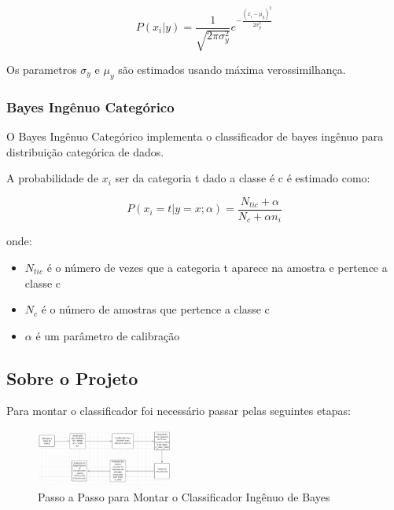 \documentclass[conference]{IEEEtran}
\begin{document}
\begin{equation}
    P(x_i|y) = \frac{1}{\sqrt{2\pi\sigma_y^2}}e^{-\frac{(x_i - \mu_y)^2}{2\sigma_y^2}}
\end{equation}

Os parametros $\sigma_y$ e $\mu_y$ são estimados usando máxima verossimilhança.

\cite{b5}
\subsubsection{Bayes Ingênuo Categórico}
O Bayes Ingênuo Categórico implementa o classificador de bayes ingênuo para distribuição categórica de dados.

A probabilidade de $x_i$ ser da categoria t dado a classe é c é estimado como:

\begin{equation}
    P(x_i = t | y = x; \alpha) = \frac{N_{tic} + \alpha}{N_c + \alpha n_i}
\end{equation}

onde:

\begin{itemize}
\item $N_{tic}$ é o número de vezes que a categoria t aparece na amostra e pertence a classe c
\item $N_c$ é o número de amostras que pertence a classe c
\item $\alpha$ é um parâmetro de calibração
\end{itemize}

\cite{b5}
\subsection{Sobre o Projeto}
Para montar o classificador foi necessário passar  pelas seguintes etapas:

\begin{figure}[H]
    \centerline{\includegraphics[width=0.4\textwidth]{IMGS/block1.png}}
    
    \caption{\label{fig:block1}Passo a Passo para Montar o Classificador Ingênuo de Bayes}
\end{figure}
\end{document}
